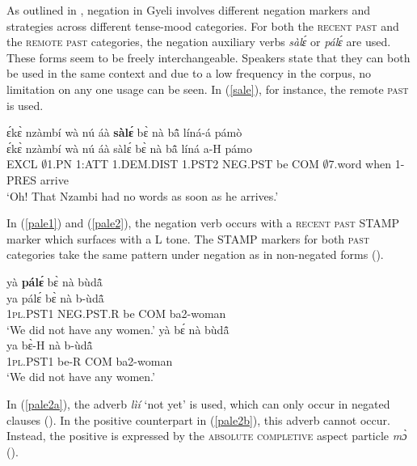 As outlined in , negation in Gyeli involves different negation markers and strategies across different tense-mood categories. For both the \textsc{recent past} and the \textsc{remote past} categories,  the negation auxiliary verbs {\itshape sàlɛ́} or {\itshape pálɛ́} are used. These forms seem to be freely interchangeable. Speakers state that they can both be used in the same context and due to a low frequency in the corpus, no limitation on any one usage can be seen.  In (\ref{sale}), for instance, the remote \textsc{past} is used.


\begin{exe} 
\ex\label{sale}
  \glll ɛ́kɛ̀ nzàmbí wà nú áà {\bfseries sàlɛ́} bɛ̀ nà bã̂ líná-á pámò \\
      ɛ́kɛ̀ nzàmbí wà nú áà sàlɛ́ bɛ̀ nà bã̂ líná a-H pámo \\
        EXCL $\emptyset$1.PN 1:ATT 1.DEM.DIST 1.PST2 NEG.PST be COM $\emptyset$7.word when 1-PRES arrive  \\
    \trans `Oh! That Nzambi had no words as soon as he arrives.'
\end{exe}

\noindent In (\ref{pale1}) and (\ref{pale2}), the negation verb occurs with a \textsc{recent past} STAMP marker which surfaces with a L tone. The STAMP markers for both \textsc{past} categories take the same pattern under negation as in non-negated forms ().

\begin{exe} 
\ex\label{pale1}
\begin{xlist}
\ex\label{pale1a}
  \glll  yà {\bfseries pálɛ́} bɛ̀ nà bùdã̂\\
      ya pálɛ́ bɛ̀ nà b-ùdã̂ \\
        1\textsc{pl}.PST1 NEG.PST.R be COM ba2-woman  \\
    \trans `We did not have any women.'
\ex\label{pale1b}
  \glll  yà bɛ́ nà bùdã̂ \\
      ya  bɛ̀-H nà b-ùdã̂ \\
        1\textsc{pl}.PST1 be-R COM ba2-woman  \\
    \trans `We did not have any women.'
\end{xlist}
\end{exe}

In (\ref{pale2a}), the adverb {\itshape lìí}  `not yet' is used, which can only occur in negated clauses (). In the positive counterpart in (\ref{pale2b}), this adverb cannot occur. Instead, the positive is expressed by the \textsc{absolute completive} aspect particle {\itshape mɔ̀} ().

